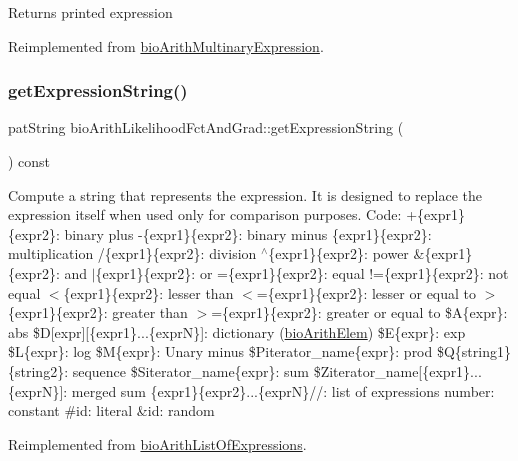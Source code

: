 \begin{DoxyReturn}{Returns}
printed expression 
\end{DoxyReturn}


Reimplemented from \hyperlink{classbio_arith_multinary_expression_a769ab218dc1f1efcdaf3204da0ecc705}{bio\+Arith\+Multinary\+Expression}.

\mbox{\label{classbio_arith_likelihood_fct_and_grad_a5f34a72c24f6d3e7215e82b2b9843e19}} 
\subsubsection{\texorpdfstring{get\+Expression\+String()}{getExpressionString()}}
{\footnotesize\ttfamily pat\+String bio\+Arith\+Likelihood\+Fct\+And\+Grad\+::get\+Expression\+String (\begin{DoxyParamCaption}{ }\end{DoxyParamCaption}) const\hspace{0.3cm}{\ttfamily [virtual]}}

Compute a string that represents the expression. It is designed to replace the expression itself when used only for comparison purposes. Code\+: +\{expr1\}\{expr2\}\+: binary plus -\/\{expr1\}\{expr2\}\+: binary minus \{expr1\}\{expr2\}\+: multiplication /\{expr1\}\{expr2\}\+: division $^\wedge$\{expr1\}\{expr2\}\+: power \&\{expr1\}\{expr2\}\+: and $\vert$\{expr1\}\{expr2\}\+: or =\{expr1\}\{expr2\}\+: equal !=\{expr1\}\{expr2\}\+: not equal $<$\{expr1\}\{expr2\}\+: lesser than $<$=\{expr1\}\{expr2\}\+: lesser or equal to $>$\{expr1\}\{expr2\}\+: greater than $>$=\{expr1\}\{expr2\}\+: greater or equal to \$A\{expr\}\+: abs \$D\mbox{[}expr\mbox{]}\mbox{[}\{expr1\}...\{exprN\}\mbox{]}\+: dictionary (\hyperlink{classbio_arith_elem}{bio\+Arith\+Elem}) \$E\{expr\}\+: exp \$L\{expr\}\+: log \$M\{expr\}\+: Unary minus \$\+Piterator\+\_\+name\{expr\}\+: prod \$Q\{string1\}\{string2\}\+: sequence \$\+Siterator\+\_\+name\{expr\}\+: sum \$\+Ziterator\+\_\+name\mbox{[}\{expr1\}...\{exprN\}\mbox{]}\+: merged sum \{expr1\}\{expr2\}...\{exprN\}//\+: list of expressions number\+: constant \#id\+: literal \&id\+: random 

Reimplemented from \hyperlink{classbio_arith_list_of_expressions_ac6a8b9493bc91520a1882df3cddc383d}{bio\+Arith\+List\+Of\+Expressions}.

